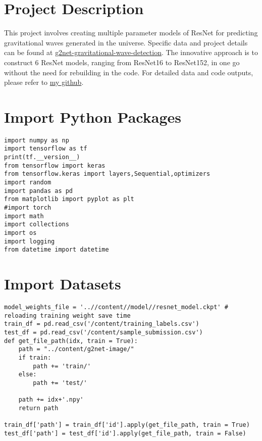 \section{Project Description}

This project involves creating multiple parameter models of ResNet for predicting gravitational waves generated in the universe. Specific data and project details can be found at \href{https://www.kaggle.com/competitions/g2net-gravitational-wave-detection/overview}{g2net-gravitational-wave-detection}. The innovative approach is to construct 6 ResNet models, ranging from ResNet16 to ResNet152, in one go without the need for rebuilding in the code. For detailed data and code outputs, please refer to \href{https://github.com/UCL-XuzeZhang/mutli-ResNet-Model/blob/main/README.md}{my github}.


\section{Import Python Packages}

\begin{verbatim}
import numpy as np
import tensorflow as tf
print(tf.__version__)
from tensorflow import keras
from tensorflow.keras import layers,Sequential,optimizers
import random
import pandas as pd
from matplotlib import pyplot as plt
#import torch
import math
import collections
import os
import logging
from datetime import datetime
\end{verbatim}

\section{Import Datasets}

\begin{verbatim}
model_weights_file = '..//content//model//resnet_model.ckpt' # reloading training weight save time
train_df = pd.read_csv('/content/training_labels.csv')
test_df = pd.read_csv('/content/sample_submission.csv')
def get_file_path(idx, train = True):
    path = "../content/g2net-image/"
    if train:
        path += 'train/'
    else:
        path += 'test/'

    path += idx+'.npy'
    return path

train_df['path'] = train_df['id'].apply(get_file_path, train = True)
test_df['path'] = test_df['id'].apply(get_file_path, train = False)
\end{verbatim}

